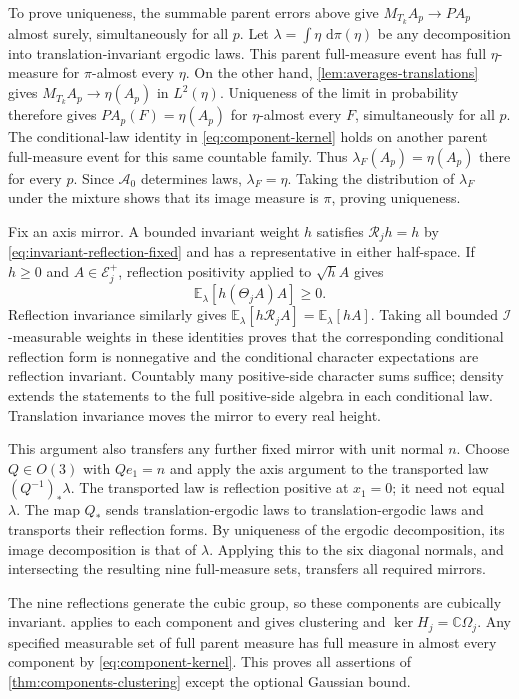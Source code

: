 \documentclass[11pt,letterpaper,reqno]{amsart}
\newcommand{\C}{\mathbb C}
\newcommand{\E}{\mathbb E}
\newcommand{\dd}{\,\mathrm d}
\begin{document}
To prove uniqueness, the summable parent errors above give
$M_{T_k}A_p\to PA_p$ almost surely, simultaneously for all $p$.
Let $\lambda=\int\eta\,\dd\pi(\eta)$ be any decomposition into
translation-invariant ergodic laws. This parent full-measure event
has full $\eta$-measure for $\pi$-almost every $\eta$.
On the other hand, \cref{lem:averages-translations} gives
$M_{T_k}A_p\to\eta(A_p)$ in $L^2(\eta)$.
Uniqueness of the limit in probability therefore gives
$PA_p(F)=\eta(A_p)$ for $\eta$-almost every $F$, simultaneously
for all $p$. The conditional-law identity in
\eqref{eq:component-kernel} holds on another parent full-measure
event for this same countable family. Thus
$\lambda_F(A_p)=\eta(A_p)$ there for every $p$.
Since $\mathcal A_0$ determines laws, $\lambda_F=\eta$.
Taking the distribution of $\lambda_F$ under the mixture shows
that its image measure is $\pi$, proving uniqueness.

Fix an axis mirror. A bounded invariant weight $h$ satisfies
$\mathcal R_jh=h$ by \eqref{eq:invariant-reflection-fixed} and has a
representative in either half-space. If $h\ge0$ and
$A\in\mathcal E_j^+$, reflection positivity applied to $\sqrt hA$
gives
\begin{equation}\label{eq:weighted-component-rp}
 \E_\lambda[h(\Theta_jA)A]\ge0.
\end{equation}
Reflection invariance similarly gives
$\E_\lambda[h\mathcal R_jA]=\E_\lambda[hA]$.
Taking all bounded $\mathcal I$-measurable weights in these identities
proves that the corresponding conditional reflection form is
nonnegative and the conditional character expectations are reflection
invariant. Countably many positive-side character sums suffice;
density extends the statements to the full positive-side algebra
in each conditional law. Translation invariance moves the mirror
to every real height.

This argument also transfers any further fixed mirror with unit normal $n$.
Choose $Q\in O(3)$ with $Qe_1=n$ and apply the axis argument to
the transported law $(Q^{-1})_*\lambda$. The transported law is
reflection positive at $x_1=0$; it need not equal $\lambda$.
The map $Q_*$ sends translation-ergodic laws to translation-ergodic
laws and transports their reflection forms. By uniqueness of the
ergodic decomposition, its image decomposition is that of $\lambda$.
Applying this to the six diagonal normals, and intersecting the
resulting nine full-measure sets, transfers all required mirrors.

The nine reflections generate the cubic group, so these components
are cubically invariant.  applies
to each component and gives clustering and
$\ker H_j=\C\Omega_j$. Any specified measurable set of full parent
measure has full measure in almost every component by
\eqref{eq:component-kernel}. This proves all assertions of
\cref{thm:components-clustering} except the optional Gaussian bound.
\end{document}
